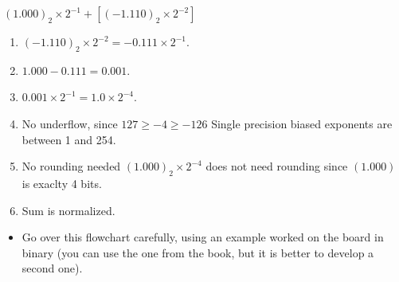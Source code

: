 \ifnum{}
\begin{frame}[fragile]
$(1.000)_2 \times 2^{-1} + [(-1.110)_2 \times 2^{-2}]$
    \begin{multicols}{2}
\begin{minipage}{2in}
        \begin{enumerate}
\item $(-1.110)_2 \times 2^{-2}=-0.111 \times 2^{-1}.$
\item $1.000 -0.111=0.001$.
\item $0.001 \times 2^{-1} = 1.0 \times 2^{-4}$.
\item No underflow, since $127 \geq -4 \geq -126$ {\tiny Single precision biased exponents are between 1 and 254.}
\item No rounding needed $(1.000)_2 \times 2^{-4}$ does not need rounding since $(1.000)$ is exaclty 4 bits.
\item Sum is normalized.
\end{enumerate}
\end{minipage}
\columnbreak
 \end{multicols}
\BNotes\ifnum{}
\begin{itemize}
\item Go over this flowchart carefully, using an example worked on the
board in binary (you can use the one from the book, but it is better
to develop a second one). 
\end{itemize}
\fi\ENotes
\end{frame}
\fi

